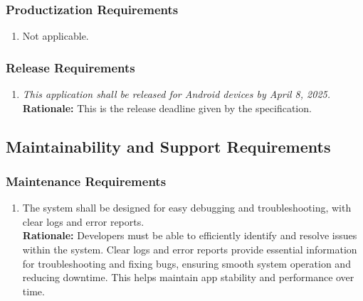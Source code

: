 \documentclass[]{article}
\begin{document}
\subsubsection{Productization Requirements}
\label{ssub:productization_requirements}
\begin{enumerate}[{OE-P}1. ]
	\item Not applicable.
\end{enumerate}

\subsubsection{Release Requirements}
\label{ssub:release_requirements}
\begin{enumerate}[{OE-R}1. ]
	\item \textit{This application shall be released for Android devices by April 8, 2025.} \\ \textbf{Rationale:} This is the release deadline given by the specification.
\end{enumerate}


\subsection{Maintainability and Support Requirements}
\label{sub:maintainability_and_support_requirements}

\subsubsection{Maintenance Requirements}
\label{ssub:maintenance_requirements}
\begin{enumerate}[{MS-M}1. ]
	\item The system shall be designed for easy debugging and troubleshooting, with clear logs and error reports.
	\\ \textbf{Rationale:} Developers must be able to efficiently identify and resolve issues within the system. Clear logs and error reports provide essential information for troubleshooting and fixing bugs, ensuring smooth system operation and reducing downtime. This helps maintain app stability and performance over time.
\end{enumerate}
\end{document}
